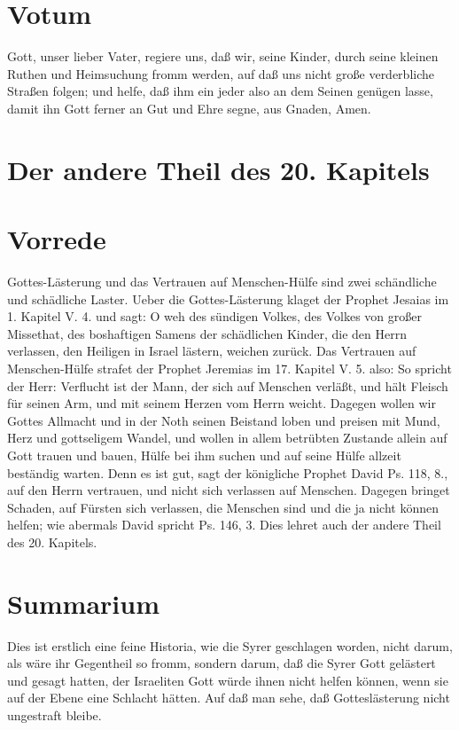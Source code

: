 \section{Votum}

Gott, unser lieber Vater, regiere uns, daß wir, seine Kinder, durch seine kleinen Ruthen und Heimsuchung fromm werden, auf daß uns nicht große verderbliche Straßen folgen; und helfe, daß ihm ein jeder also an dem Seinen genügen lasse, damit ihn Gott ferner an Gut und Ehre segne, aus Gnaden, Amen.

\section{Der andere Theil des 20. Kapitels}

\section{Vorrede}

Gottes-Lästerung und das Vertrauen auf Menschen-Hülfe sind zwei schändliche und schädliche Laster. Ueber die Gottes-Lästerung klaget der Prophet Jesaias im 1. Kapitel V. 4. und sagt: O weh des sündigen Volkes, des Volkes von großer Missethat, des boshaftigen Samens der schädlichen Kinder, die den Herrn verlassen, den Heiligen in Israel lästern, weichen zurück. Das Vertrauen auf Menschen-Hülfe strafet der Prophet Jeremias im 17. Kapitel V. 5. also: So spricht der Herr: Verflucht ist der Mann, der sich auf Menschen verläßt, und hält Fleisch für seinen Arm, und mit seinem Herzen vom Herrn weicht. Dagegen wollen wir Gottes Allmacht und in der Noth seinen Beistand loben und preisen mit Mund, Herz und gottseligem Wandel, und wollen in allem betrübten Zustande allein auf Gott trauen und bauen, Hülfe bei ihm suchen und auf seine Hülfe allzeit beständig warten. Denn es ist gut, sagt der königliche Prophet David Ps. 118, 8., auf den Herrn vertrauen, und nicht sich verlassen auf Menschen. Dagegen bringet Schaden, auf Fürsten sich verlassen, die Menschen sind und die ja nicht können helfen; wie abermals David spricht Ps. 146, 3. Dies lehret auch der andere Theil des 20. Kapitels.

\section{Summarium}

Dies ist erstlich eine feine Historia, wie die Syrer geschlagen worden, nicht darum, als wäre ihr Gegentheil so fromm, sondern darum, daß die Syrer Gott gelästert und gesagt hatten, der Israeliten Gott würde ihnen nicht helfen können, wenn sie auf der Ebene eine Schlacht hätten. Auf daß man sehe, daß Gotteslästerung nicht ungestraft bleibe.

